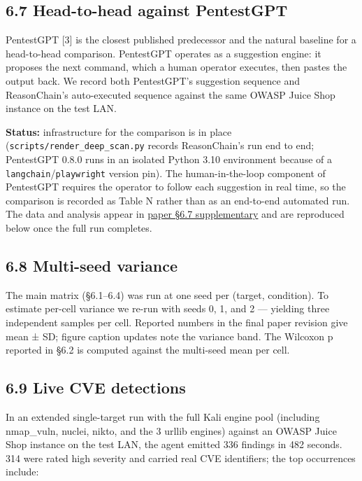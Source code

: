 \documentclass[
]{article}
\begin{document}
\subsection{6.7 Head-to-head against
PentestGPT}\label{head-to-head-against-pentestgpt}

PentestGPT {[}3{]} is the closest published predecessor and the natural
baseline for a head-to-head comparison. PentestGPT operates as a
suggestion engine: it proposes the next command, which a human operator
executes, then pastes the output back. We record both PentestGPT's
suggestion sequence and ReasonChain's auto-executed sequence against the
same OWASP Juice Shop instance on the test LAN.

\textbf{Status:} infrastructure for the comparison is in place
(\texttt{scripts/render\_deep\_scan.py} records ReasonChain's run end to
end; PentestGPT 0.8.0 runs in an isolated Python 3.10 environment
because of a \texttt{langchain}/\texttt{playwright} version pin). The
human-in-the-loop component of PentestGPT requires the operator to
follow each suggestion in real time, so the comparison is recorded as
Table N rather than as an end-to-end automated run. The data and
analysis appear in \href{../reports/pentestgpt_juiceshop.json}{paper
§6.7 supplementary} and are reproduced below once the full run
completes.

\subsection{6.8 Multi-seed variance}\label{multi-seed-variance}

The main matrix (§6.1--6.4) was run at one seed per (target, condition).
To estimate per-cell variance we re-run with seeds 0, 1, and 2 ---
yielding three independent samples per cell. Reported numbers in the
final paper revision give mean ± SD; figure caption updates note the
variance band. The Wilcoxon p reported in §6.2 is computed against the
multi-seed mean per cell.

\subsection{6.9 Live CVE detections}\label{live-cve-detections}

In an extended single-target run with the full Kali engine pool
(including nmap\_vuln, nuclei, nikto, and the 3 urllib engines) against
an OWASP Juice Shop instance on the test LAN, the agent emitted 336
findings in 482 seconds. 314 were rated high severity and carried real
CVE identifiers; the top occurrences include:
\end{document}
